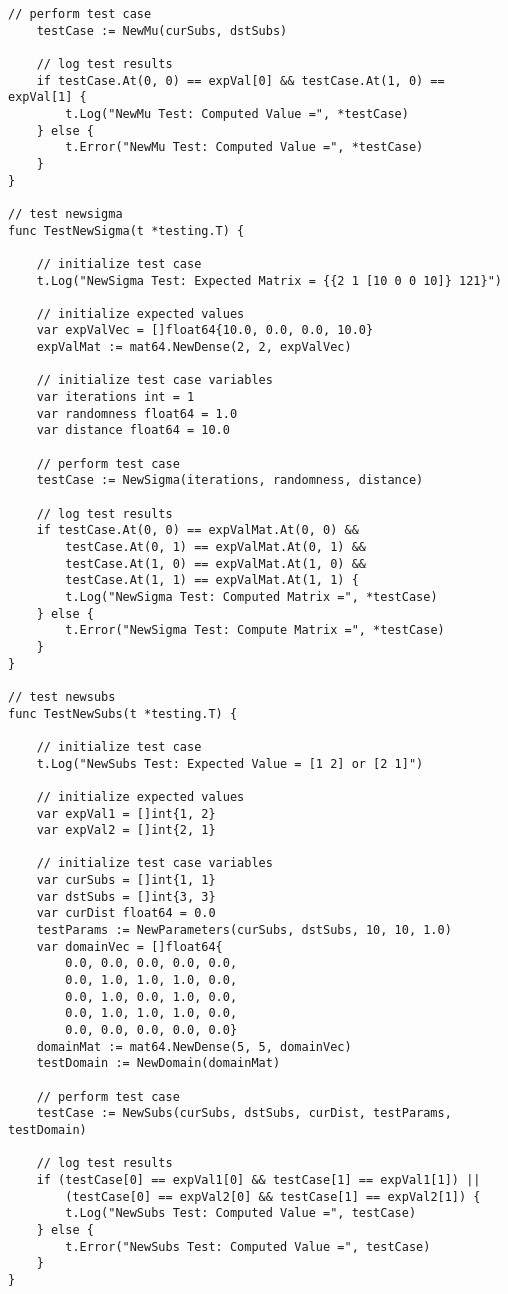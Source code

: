\begin{lstlisting}[basicstyle=\tiny]
	// perform test case
	testCase := NewMu(curSubs, dstSubs)

	// log test results
	if testCase.At(0, 0) == expVal[0] && testCase.At(1, 0) == expVal[1] {
		t.Log("NewMu Test: Computed Value =", *testCase)
	} else {
		t.Error("NewMu Test: Computed Value =", *testCase)
	}
}

// test newsigma
func TestNewSigma(t *testing.T) {

	// initialize test case
	t.Log("NewSigma Test: Expected Matrix = {{2 1 [10 0 0 10]} 121}")

	// initialize expected values
	var expValVec = []float64{10.0, 0.0, 0.0, 10.0}
	expValMat := mat64.NewDense(2, 2, expValVec)

	// initialize test case variables
	var iterations int = 1
	var randomness float64 = 1.0
	var distance float64 = 10.0

	// perform test case
	testCase := NewSigma(iterations, randomness, distance)

	// log test results
	if testCase.At(0, 0) == expValMat.At(0, 0) &&
		testCase.At(0, 1) == expValMat.At(0, 1) &&
		testCase.At(1, 0) == expValMat.At(1, 0) &&
		testCase.At(1, 1) == expValMat.At(1, 1) {
		t.Log("NewSigma Test: Computed Matrix =", *testCase)
	} else {
		t.Error("NewSigma Test: Compute Matrix =", *testCase)
	}
}

// test newsubs
func TestNewSubs(t *testing.T) {

	// initialize test case
	t.Log("NewSubs Test: Expected Value = [1 2] or [2 1]")

	// initialize expected values
	var expVal1 = []int{1, 2}
	var expVal2 = []int{2, 1}

	// initialize test case variables
	var curSubs = []int{1, 1}
	var dstSubs = []int{3, 3}
	var curDist float64 = 0.0
	testParams := NewParameters(curSubs, dstSubs, 10, 10, 1.0)
	var domainVec = []float64{
		0.0, 0.0, 0.0, 0.0, 0.0,
		0.0, 1.0, 1.0, 1.0, 0.0,
		0.0, 1.0, 0.0, 1.0, 0.0,
		0.0, 1.0, 1.0, 1.0, 0.0,
		0.0, 0.0, 0.0, 0.0, 0.0}
	domainMat := mat64.NewDense(5, 5, domainVec)
	testDomain := NewDomain(domainMat)

	// perform test case
	testCase := NewSubs(curSubs, dstSubs, curDist, testParams, testDomain)

	// log test results
	if (testCase[0] == expVal1[0] && testCase[1] == expVal1[1]) ||
		(testCase[0] == expVal2[0] && testCase[1] == expVal2[1]) {
		t.Log("NewSubs Test: Computed Value =", testCase)
	} else {
		t.Error("NewSubs Test: Computed Value =", testCase)
	}
}


\end{lstlisting}
